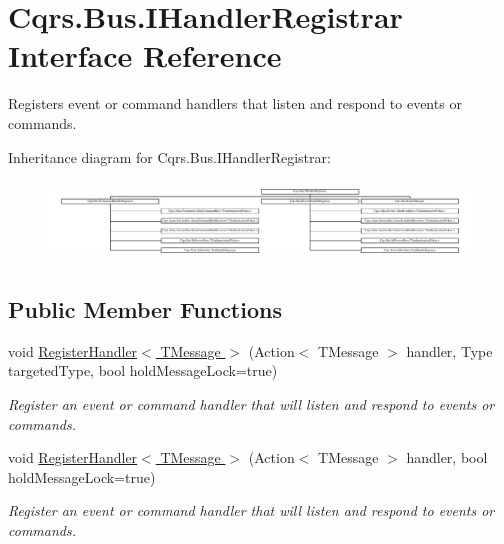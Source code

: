 \hypertarget{interfaceCqrs_1_1Bus_1_1IHandlerRegistrar}{}\section{Cqrs.\+Bus.\+I\+Handler\+Registrar Interface Reference}
\label{interfaceCqrs_1_1Bus_1_1IHandlerRegistrar}


Registers event or command handlers that listen and respond to events or commands.  


Inheritance diagram for Cqrs.\+Bus.\+I\+Handler\+Registrar\+:\begin{figure}[H]
\begin{center}
\leavevmode
\includegraphics[height=2.116631cm]{interfaceCqrs_1_1Bus_1_1IHandlerRegistrar}
\end{center}
\end{figure}
\subsection*{Public Member Functions}
\begin{DoxyCompactItemize}
\item 
void \hyperlink{interfaceCqrs_1_1Bus_1_1IHandlerRegistrar_ab6ca4dfdc54a5aeebe4651dbdb479f55_ab6ca4dfdc54a5aeebe4651dbdb479f55}{Register\+Handler$<$ T\+Message $>$} (Action$<$ T\+Message $>$ handler, Type targeted\+Type, bool hold\+Message\+Lock=true)
\begin{DoxyCompactList}\small\item\em Register an event or command handler that will listen and respond to events or commands. \end{DoxyCompactList}\item 
void \hyperlink{interfaceCqrs_1_1Bus_1_1IHandlerRegistrar_a07792dcc9a8b272709ff2e2dd336a642_a07792dcc9a8b272709ff2e2dd336a642}{Register\+Handler$<$ T\+Message $>$} (Action$<$ T\+Message $>$ handler, bool hold\+Message\+Lock=true)
\begin{DoxyCompactList}\small\item\em Register an event or command handler that will listen and respond to events or commands. \end{DoxyCompactList}\end{DoxyCompactItemize}


